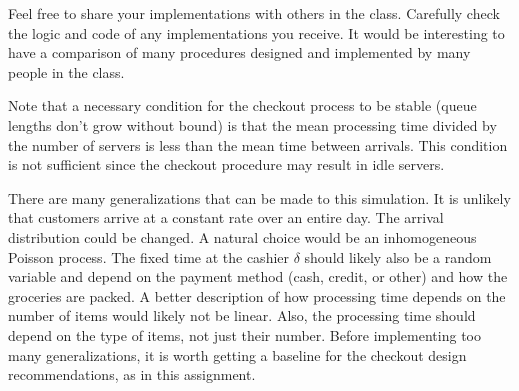 \documentclass[letter]{article}
\begin{document}
Feel free to share your implementations with others in the class. Carefully check the logic and code of any implementations you receive. It would be interesting to have a comparison of many procedures designed and implemented by many people in the class.

Note that a necessary condition for the checkout process to be stable (queue lengths don't grow without bound) is that the mean processing time divided by the number of servers is less than the mean time between arrivals. This condition is not sufficient since the checkout procedure may result in idle servers.

There are many generalizations that can be made to this simulation. It is unlikely that customers arrive at a constant rate over an entire day. The arrival distribution could be changed. A natural choice would be an inhomogeneous Poisson process. The fixed time at the cashier $\delta$ should likely also be a random variable and depend on the payment method (cash, credit, or other) and how the groceries are packed. A better description of how processing time depends on the number of items would likely not be linear. Also, the processing time should depend on the type of items, not just their number. Before implementing too many generalizations, it is worth getting a baseline for the checkout design recommendations, as in this assignment.




	
\end{document}
